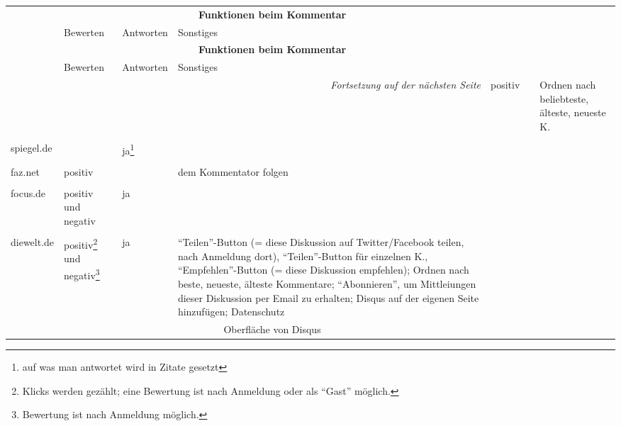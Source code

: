 \begin{landscape} \footnotesize
  \begin{longtable}{l|p{40mm}p{40mm}p{80mm}}

  & \multicolumn{3}{c}{\bfseries Funktionen beim Kommentar} \\
  & Bewerten & Antworten & Sonstiges \\\hline
  \endfirsthead

  & \multicolumn{3}{c}{\bfseries Funktionen beim Kommentar} \\
  &  Bewerten & Antworten & Sonstiges \\\hline
  \endhead

  \hline \multicolumn{4}{r}{\emph{Fortsetzung auf der nächsten Seite}}
  \endfoot

  \hline
  \endlastfoot



\hline

  bild.de &
    positiv & & Ordnen nach beliebteste, älteste, neueste K.\\
    & \multicolumn{3}{c}{}\\\hline

  spiegel.de &
  & ja\footnote{auf was man antwortet wird in Zitate gesetzt} & \\
  & \multicolumn{3}{c}{}\\\hline

  faz.net & positiv & & dem Kommentator folgen \\
          & \multicolumn{3}{c}{}\\\hline

  focus.de & positiv und negativ & ja & \\
           & \multicolumn{3}{c}{}\\\hline

  diewelt.de &
    positiv\footnote{Klicks werden gezählt; eine Bewertung ist nach Anmeldung oder als ``Gast'' möglich.}
    und negativ\footnote{Bewertung ist nach Anmeldung möglich.} &
    ja &
    ``Teilen''-Button (= diese Diskussion auf Twitter/Facebook teilen, nach
    Anmeldung dort), ``Teilen''-Button für einzelnen K., ``Empfehlen''-Button (=
    diese Diskussion empfehlen); Ordnen nach beste, neueste, älteste Kommentare;
    ``Abonnieren'', um Mittleiungen dieser Diskussion per Email zu erhalten;
    Disqus auf der eigenen Seite hinzufügen; Datenschutz\\
    & \multicolumn{3}{c}{Oberfläche von Disqus}\\\hline


\end{longtable}
\end{landscape}
